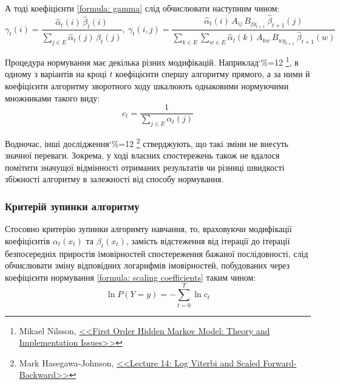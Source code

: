 А тоді коефіцієнти \eqref{formula: gamma} слід обчислювати наступним чином:
\begin{equation*}
    \gamma_t(i)= \frac{\widehat{\alpha}_t(i)\,\widehat{\beta}_t(i)}{\sum\limits_{j \in E}\widehat{\alpha}_t(j)\,\widehat{\beta}_t(j)}, \
    \gamma_t(i,j)=\frac{\widehat{\alpha}_t(i)\,A_{ij}\,B_{jy_{t+1}}\,\widehat{\beta}_{t+1}(j)}
        {\sum\limits_{k \in E}\sum\limits_{w \in E}\widehat{\alpha}_t(k)\,A_{kw}\,B_{wy_{t+1}}\,\widehat{\beta}_{t+1}(w)}
\end{equation*}

Процедура нормування має декілька різних модифікацій. Наприклад\catcode`\%=12 \footnote{
    Mikael Nilsson, \href{https://www.google.com/url?sa=t&rct=j&q=&esrc=s&source=web&cd=&cad=rja&uact=8&ved=2ahUKEwjYpp2ix577AhWgi_0HHWj2CgIQFnoECAwQAQ&url=https%3A%2F%2Fwww.semanticscholar.org%2Fpaper%2FFirst-Order-Hidden-Markov-Model-%253A-Theory-and-Issues-Nilsson%2Fb377061fca96921bc12dcc3609ddc9e526d96daf&usg=AOvVaw0-xnjeeFXADozjvvUFlOPQ}
    {<<First Order Hidden Markov Model: Theory and Implementation Issues>>}}, 
в одному з варіантів на кроці $t$ коефіцієнти спершу алгоритму прямого, а за ними й коефіцієнти алгоритму зворотного ходу шкалюють однаковими нормуючими множниками такого виду:
\begin{equation}
    c_t = \frac{1}{\sum\limits_{j \in E}\alpha_t(j)}
    \label{formula: scaling coefficients}
\end{equation}

Водночас, інші дослідження\catcode`\%=12 \footnote{
    Mark Hasegawa-Johnson, \href{https://www.google.com/url?sa=t&rct=j&q=&esrc=s&source=web&cd=&ved=2ahUKEwiL1Y-rt577AhXdxQIHHReZCksQFnoECAsQAQ&url=https%3A%2F%2Fcourses.engr.illinois.edu%2Fece417%2Ffa2020%2Fslides%2Flec14.pdf&usg=AOvVaw0Y9Q3DuoKI0YP8XBedlu_H}
    {<<Lecture 14: Log Viterbi and Scaled Forward-Backward>>}}
стверджують, що такі зміни не внесуть значної переваги. Зокрема, у ході власних спостережень також не вдалося помітити значущої відмінності отриманих результатів чи різниці швидкості збіжності алгоритму в залежності від способу нормування.  

\subsubsection{Критерій зупинки алгоритму}

Стосовно критерію зупинки алгоримту навчання, то, враховуючи модифікації коефіцієнтів $\alpha_t(x_t)$ та $\beta_t(x_t)$, замість відстеження від ітерації до ітерації безпосередніх приростів імовірностей спостереження бажаної послідовності, слід обчислювати зміну відповідних логарифмів імовірностей, побудованих через коефіцієнти нормування \eqref{formula: scaling coefficients} таким чином:
\begin{equation}
    \ln P(Y=y) = -\sum\limits_{t=0}^{T}\ln c_t
    \label{formula: stop criterion}
\end{equation}

